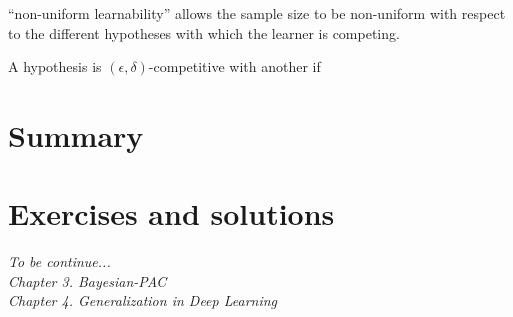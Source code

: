 \documentclass{article}
\begin{document}
“non-uniform learnability” allows the sample size to be non-uniform with respect to the different hypotheses with which the learner is competing. 

A hypothesis is $(\epsilon, \delta)$-competitive with another if
\section{Summary}
%


\section{Exercises and solutions}

\textit{
      To be continue...\\
      Chapter 3. Bayesian-PAC\\
      Chapter 4. Generalization in Deep Learning}
\end{document}
